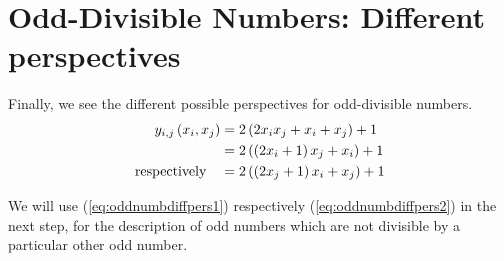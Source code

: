 \section{Odd-Divisible Numbers: Different perspectives}
\label{s:odddivisiblenumbersdiffperspectives}
Finally, we see the different possible perspectives for odd-divisible numbers.
\begin{alignat}{3}
	y_{i,j}\left(x_{i},x_{j}\right) &= 2\left(2x_{i}x_{j} + x_{i} + x_{j}\right) + 1 \notag \\
	&= 2\left(\left(2x_{i} + 1\right)x_{j} + x_{i}\right) + 1 \label{eq:oddnumbdiffpers1}\\
	\mathrm{respectively} \quad &= 2\left(\left(2x_{j} + 1\right)x_{i} + x_{j}\right) + 1
\label{eq:oddnumbdiffpers2}
\end{alignat}

We will use (\ref{eq:oddnumbdiffpers1}) respectively (\ref{eq:oddnumbdiffpers2}) in the next step, for the description of odd numbers which are not divisible by a particular other odd number.




















